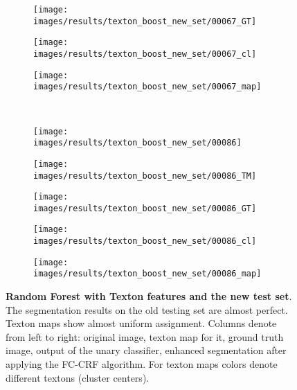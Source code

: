 \begin{figure}[t]
\begin{subfigure}[c]{0.19\textwidth}
 \end{subfigure}
 \begin{subfigure}[c]{0.19\textwidth}
  \centering
  \texttt{[image: images/results/texton\_boost\_new\_set/00067\_GT]}
 \end{subfigure}
 \begin{subfigure}[c]{0.19\textwidth}
  \centering
  \texttt{[image: images/results/texton\_boost\_new\_set/00067\_cl]}
 \end{subfigure}
 \begin{subfigure}[c]{0.19\textwidth}
  \centering
  \texttt{[image: images/results/texton\_boost\_new\_set/00067\_map]}
 \end{subfigure}
 \\
 \begin{subfigure}[c]{0.19\textwidth}
  \centering
  \texttt{[image: images/results/texton\_boost\_new\_set/00086]}
 \end{subfigure}
 \begin{subfigure}[c]{0.19\textwidth}
  \centering
  \texttt{[image: images/results/texton\_boost\_new\_set/00086\_TM]}
 \end{subfigure}
 \begin{subfigure}[c]{0.19\textwidth}
  \centering
  \texttt{[image: images/results/texton\_boost\_new\_set/00086\_GT]}
 \end{subfigure}
 \begin{subfigure}[c]{0.19\textwidth}
  \centering
  \texttt{[image: images/results/texton\_boost\_new\_set/00086\_cl]}
 \end{subfigure}
 \begin{subfigure}[c]{0.19\textwidth}
  \centering
  \texttt{[image: images/results/texton\_boost\_new\_set/00086\_map]}
 \end{subfigure}
 \caption[Random Forest with Texton features and the old test set]{
 {\bf Random Forest with Texton features and the new test set}. The segmentation results on the old testing set are almost perfect. Texton maps
 show almost uniform assignment.
 Columns denote from left to right: original image, texton map for it, ground truth image, output of the unary classifier, enhanced segmentation 
 after applying the FC-CRF algorithm. For texton maps colors denote different textons (cluster centers).}
 \label{fig:old_set_texton_boost}
\end{figure}

\clearpage

